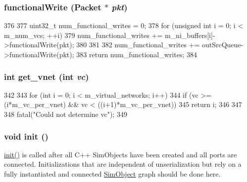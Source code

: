 \hypertarget{classNetworkInterface__d_aba9037f662122b5f2e85647d35670e5c}{
\subsubsection[{functionalWrite}]{ functionalWrite ({\bf Packet} $\ast$ {\em pkt})}}
\label{classNetworkInterface__d_aba9037f662122b5f2e85647d35670e5c}



\begin{DoxyCode}
376 {
377     uint32_t num_functional_writes = 0;
378     for (unsigned int i  = 0; i < m_num_vcs; ++i) {
379         num_functional_writes += m_ni_buffers[i]->functionalWrite(pkt);
380     }
381 
382     num_functional_writes += outSrcQueue->functionalWrite(pkt);
383     return num_functional_writes;
384 }
\end{DoxyCode}
\hypertarget{classNetworkInterface__d_ae73de77352867d272505f41222809e17}{
\subsubsection[{get\_\-vnet}]{\setlength{\rightskip}{0pt plus 5cm}int get\_\-vnet (int {\em vc})}}
\label{classNetworkInterface__d_ae73de77352867d272505f41222809e17}



\begin{DoxyCode}
342 {
343     for (int i = 0; i < m_virtual_networks; i++) {
344         if (vc >= (i*m_vc_per_vnet) && vc < ((i+1)*m_vc_per_vnet)) {
345             return i;
346         }
347     }
348     fatal("Could not determine vc");
349 }
\end{DoxyCode}
\hypertarget{classNetworkInterface__d_a02fd73d861ef2e4aabb38c0c9ff82947}{
\subsubsection[{init}]{\setlength{\rightskip}{0pt plus 5cm}void init ()}}
\label{classNetworkInterface__d_a02fd73d861ef2e4aabb38c0c9ff82947}
\hyperlink{classNetworkInterface__d_a02fd73d861ef2e4aabb38c0c9ff82947}{init()} is called after all C++ SimObjects have been created and all ports are connected. Initializations that are independent of unserialization but rely on a fully instantiated and connected \hyperlink{classSimObject}{SimObject} graph should be done here. 

